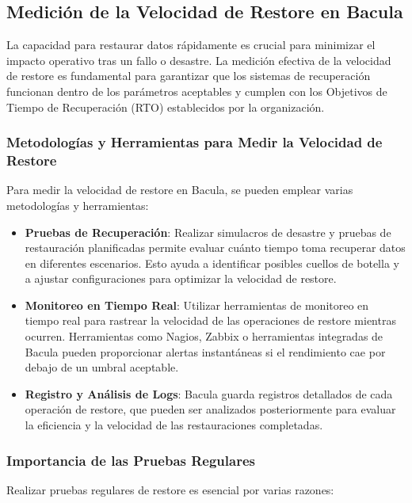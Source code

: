 \subsection{Medición de la Velocidad de Restore en Bacula}

La capacidad para restaurar datos rápidamente es crucial para minimizar el impacto operativo tras un fallo o desastre. La medición efectiva de la velocidad de restore es fundamental para garantizar que los sistemas de recuperación funcionan dentro de los parámetros aceptables y cumplen con los Objetivos de Tiempo de Recuperación (RTO) establecidos por la organización.

\subsubsection{Metodologías y Herramientas para Medir la Velocidad de Restore}

Para medir la velocidad de restore en Bacula, se pueden emplear varias metodologías y herramientas:

\begin{itemize}
    \item \textbf{Pruebas de Recuperación}: Realizar simulacros de desastre y pruebas de restauración planificadas permite evaluar cuánto tiempo toma recuperar datos en diferentes escenarios. Esto ayuda a identificar posibles cuellos de botella y a ajustar configuraciones para optimizar la velocidad de restore.
    \item \textbf{Monitoreo en Tiempo Real}: Utilizar herramientas de monitoreo en tiempo real para rastrear la velocidad de las operaciones de restore mientras ocurren. Herramientas como Nagios, Zabbix o herramientas integradas de Bacula pueden proporcionar alertas instantáneas si el rendimiento cae por debajo de un umbral aceptable.
    \item \textbf{Registro y Análisis de Logs}: Bacula guarda registros detallados de cada operación de restore, que pueden ser analizados posteriormente para evaluar la eficiencia y la velocidad de las restauraciones completadas.
\end{itemize}

\subsubsection{Importancia de las Pruebas Regulares}

Realizar pruebas regulares de restore es esencial por varias razones:

